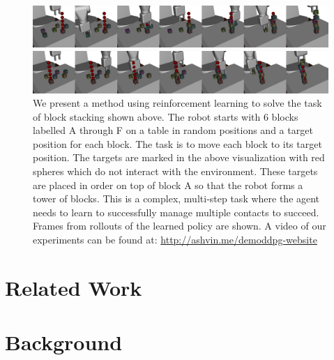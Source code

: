 \documentclass[letterpaper, 10 pt, conference]{ieeeconf}  %
\DeclareMathOperator{\E}{\mathbb{E}}
\begin{document}
\begin{figure}[t]
    \vspace{6pt}
    \centering
    \includegraphics[width=1.0\linewidth]{figs/combined1}
    
    \vspace{0.1cm}
    
    \includegraphics[width=1.0\linewidth]{figs/combined2}
    \caption{We present a method using reinforcement learning to solve the task of block stacking shown above. The robot starts with 6 blocks labelled A through F on a table in random positions and a target position for each block. The task is to move each block to its target position. The targets are marked in the above visualization with red spheres which do not interact with the environment. These targets are placed in order on top of block A so that the robot forms a tower of blocks. This is a complex, multi-step task where the agent needs to learn to successfully manage multiple contacts to succeed. Frames from rollouts of the learned policy are shown. A video of our experiments can be found at:  \url{http://ashvin.me/demoddpg-website} }%
    \vspace{-3pt}
    \label{fig:fig1}
\end{figure}

\section{Related Work}



\section{Background}


\end{document}
